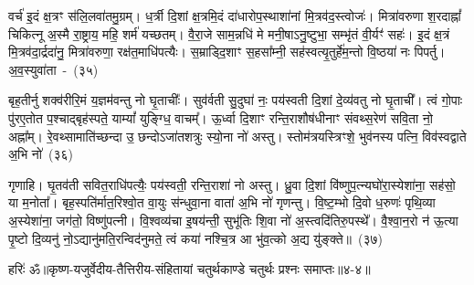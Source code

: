 वर्च॑ इ॒दं क्ष॒त्रꣳ स॑लि॒लवा॑तमु॒ग्रम्। ध॒र्त्री दि॒शां क्ष॒त्रमि॒दं दा॑धारोप॒स्थाशा॑नां मि॒त्रव॑द॒स्त्वोजः॑। मित्रा॑वरुणा श॒रदाह्नां᳚ चिकित्नू अ॒स्मै रा॒ष्ट्राय॒ महि॒ शर्म॑ यच्छतम्। वै॒रा॒जे साम॒न्नधि॑ मे मनी॒षाऽनु॒ष्टुभा॒ सम्भृ॑तं वी॒र्यꣳ॑ सहः॑। इ॒दं क्ष॒त्रं मि॒त्रव॑दा॒र्द्रदा॑नु॒ मित्रा॑वरुणा॒ रक्ष॑त॒माधि॑पत्यैः। स॒म्राड्दि॒शाꣳ स॒हसा᳚म्नी॒ सह॑स्वत्यृ॒तुर्\mbox{}हे॑म॒न्तो वि॒ष्ठया॑ नः पिपर्तु। अ॒व॒स्युवा॑ता~-~(३५)\ip

बृह॒तीर्नु शक्व॑रीरि॒मं य॒ज्ञम॑वन्तु नो घृ॒ताचीः᳚। सुव॑र्वती सु॒दुघा॑ नः॒ पय॑स्वती दि॒शां दे॒व्य॑वतु नो घृ॒ताची᳚। त्वं गो॒पाः पु॑रए॒तोत प॒श्चाद्बृह॑स्पते॒ याम्यां᳚ युङ्ग्धि॒ वाचम्᳚। ऊ॒र्ध्वा दि॒शाꣳ रन्ति॒राशौष॑धीनाꣳ संवथ्स॒रेण॑ सवि॒ता नो॒ अह्ना᳚म्। रे॒वथ्सामाति॑च्छन्दा उ॒ छन्दोऽजा॑तशत्रुः स्यो॒ना नो॑ अस्तु। स्तोम॑त्रयस्त्रिꣳशे॒ भुव॑नस्य पत्नि॒ विव॑स्वद्वाते अ॒भि नो॑~(३६)\ip

गृणाहि। घृ॒तव॑ती सवित॒राधि॑पत्यैः॒ पय॑स्वती॒ रन्ति॒राशा॑ नो अस्तु। ध्रु॒वा दि॒शां वि॑ष्णुप॒त्न्यघो॑रा॒स्येशा॑ना॒ सह॑सो॒ या म॒नोता᳚। बृह॒स्पति॑र्मात॒रिश्वो॒त वा॒युः स॑न्धुवा॒ना वाता॑ अ॒भि नो॑ गृणन्तु। वि॒ष्ट॒म्भो दि॒वो ध॒रुणः॑ पृथि॒व्या अ॒स्येशा॑ना॒ जग॑तो॒ विष्णु॑पत्नी। वि॒श्वव्य॑चा इ॒षय॑न्ती॒ सुभू॑तिः शि॒वा नो॑ अ॒स्त्वदि॑तिरु॒पस्थे᳚। वै॒श्वा॒न॒रो न॑ ऊ॒त्या पृ॒ष्टो दि॒व्यनु॑ नो॒\-ऽद्यानु॑मति॒रन्विद॑नुमते॒ त्वं कया॑ नश्चि॒त्र आ भु॑व॒त्को अ॒द्य यु॑ङ्क्ते॥~(३७)\ip

{\anuvakamend[{महि॑ सप्तद॒शेना॑व॒स्युवा॑ता अ॒भि नो\-ऽनु॑ न॒श्चतु॑र्दश च}]}%

{हरिः॑ ॐ}{॥कृष्ण-यजुर्वेदीय-तैत्तिरीय-संहितायां चतुर्थकाण्डे चतुर्थः प्रश्नः समाप्तः॥४-४॥}


